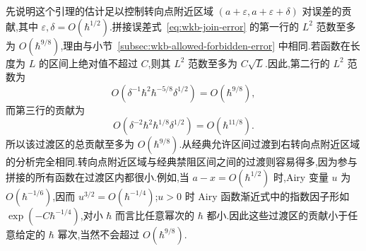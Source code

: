 先说明这个引理的估计足以控制转向点附近区域 $(a+\varepsilon,a+\varepsilon+\delta)$ 对误差的贡献,其中 $\varepsilon,\delta=O(\hbar^{1/2})$.拼接误差式~\eqref{eq:wkb-join-error} 的第一行的 $L^2$ 范数至多为 $O(\hbar^{9/8})$,理由与小节~\ref{subsec:wkb-allowed-forbidden-error} 中相同.若函数在长度为 $L$ 的区间上绝对值不超过 $C$,则其 $L^2$ 范数至多为 $C\sqrt L$.因此,第二行的 $L^2$ 范数为
\[
O\left(\delta^{-1}\hbar^2\hbar^{-5/8}\delta^{1/2}\right)
=O(\hbar^{9/8}),
\]
而第三行的贡献为
\[
O\left(\delta^{-2}\hbar^2\hbar^{1/8}\delta^{1/2}\right)
=O(\hbar^{11/8}).
\]
所以该过渡区的总贡献至多为 $O(\hbar^{9/8})$.从经典允许区间过渡到右转向点附近区域的分析完全相同.转向点附近区域与经典禁阻区间之间的过渡则容易得多,因为参与拼接的所有函数在过渡区内都很小.例如,当 $a-x=O(\hbar^{1/2})$ 时,Airy 变量 $u$ 为 $O(\hbar^{-1/6})$,因而 $u^{3/2}=O(\hbar^{-1/4})$;$u>0$ 时 Airy 函数渐近式中的指数因子形如 $\exp(-C\hbar^{-1/4})$,对小 $\hbar$ 而言比任意幂次的 $\hbar$ 都小.因此这些过渡区的贡献小于任意给定的 $\hbar$ 幂次,当然不会超过 $O(\hbar^{9/8})$.

